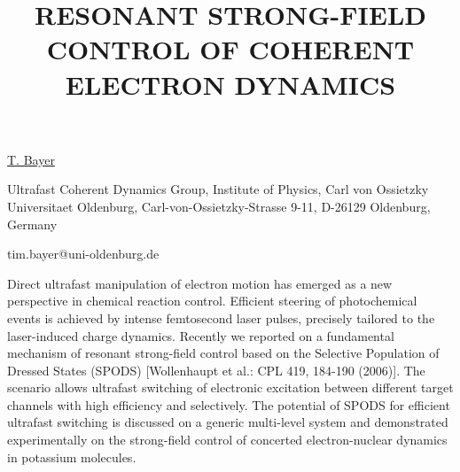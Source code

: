 \title{RESONANT STRONG-FIELD CONTROL OF COHERENT ELECTRON DYNAMICS}

\underline{T. Bayer} 

{\normalsize{\vspace{-4mm}
Ultrafast Coherent Dynamics Group,
Institute of Physics,
Carl von Ossietzky Universitaet Oldenburg,
Carl-von-Ossietzky-Strasse 9-11,
D-26129 Oldenburg, Germany

\email tim.bayer@uni-oldenburg.de}}

Direct ultrafast manipulation of electron motion has emerged as a new perspective in chemical reaction control. Efficient steering of photochemical events is achieved by intense femtosecond laser pulses, precisely tailored to the laser-induced charge dynamics. Recently we reported on a fundamental mechanism of resonant strong-field control based on the Selective Population of Dressed States (SPODS) [Wollenhaupt et al.: CPL 419, 184-190 (2006)]. The scenario allows ultrafast switching of electronic excitation between different target channels with high efficiency and selectively. The potential of SPODS for efficient ultrafast switching is discussed on a generic multi-level system and demonstrated experimentally on the strong-field control of concerted electron-nuclear dynamics in potassium molecules.

\vspace{\baselineskip}
